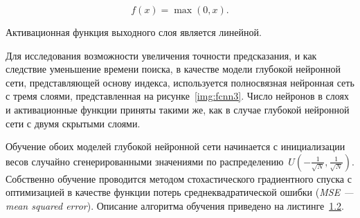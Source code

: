 
\begin{equation}\label{eq:eq01}
    f(x) = \max (0, x).
\end{equation}

Активационная функция выходного слоя является линейной.

Для исследования возможности увеличения точности предсказания, и как следствие
уменьшение времени поиска, в качестве модели глубокой нейронной сети,
представляющей основу индекса, используется полносвязная нейронная сеть с тремя
слоями, представленная на рисунке~\ref{img:fcnn3}. Число нейронов в слоях и
активационные функции приняты такими же, как в случае глубокой нейронной сети с
двумя скрытыми слоями.


Обучение обоих моделей глубокой нейронной сети начинается с инициализации весов
случайно сгенерированными значениями по распределению~$U(-\frac{1}{\sqrt{N}},
\frac{1}{\sqrt{N}})$. Собственно обучение проводится методом стохастического
градиентного спуска с оптимизацией в качестве функции потерь
среднеквадратической ошибки (\textit{MSE --- mean squared error}). Описание
алгоритма обучения приведено на листинге~\hyperref[alg:sdg]{1.2}. 
\vspace{1.5cm}

